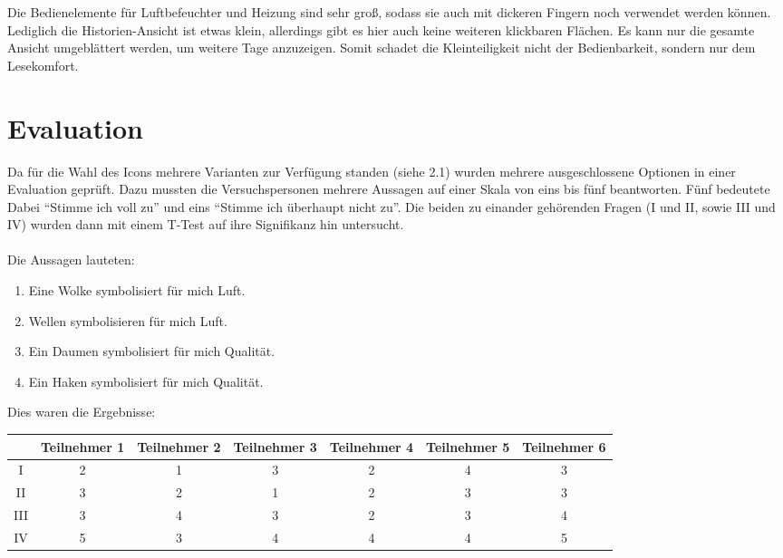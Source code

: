 \documentclass[a4paper,10pt]{article}
\begin{document}
Die Bedienelemente für Luftbefeuchter und Heizung sind sehr groß, sodass sie auch mit dickeren Fingern noch verwendet werden können. Lediglich die Historien-Ansicht ist etwas klein, allerdings gibt es hier auch keine weiteren klickbaren Flächen. Es kann nur die gesamte Ansicht umgeblättert werden, um weitere Tage anzuzeigen. Somit schadet die Kleinteiligkeit nicht der Bedienbarkeit, sondern nur dem Lesekomfort.

\newpage



\section{Evaluation}

Da für die Wahl des Icons mehrere Varianten zur Verfügung standen (siehe 2.1) wurden mehrere ausgeschlossene Optionen in einer Evaluation geprüft. Dazu mussten die Versuchspersonen mehrere Aussagen auf einer Skala von eins bis fünf beantworten. Fünf bedeutete Dabei ``Stimme ich voll zu'' und eins ``Stimme ich überhaupt nicht zu''. Die beiden zu einander gehörenden Fragen (I und II, sowie III und IV) wurden dann mit einem T-Test auf ihre Signifikanz hin untersucht.\\ \\

Die Aussagen lauteten:

\begin{enumerate}[I]

\item
Eine Wolke symbolisiert für mich Luft.

\item
Wellen symbolisieren für mich Luft.

\item
Ein Daumen symbolisiert für mich Qualität.

\item
Ein Haken symbolisiert für mich Qualität. \\

\end{enumerate}

Dies waren die Ergebnisse:\\

\begin{tabular}{c|c|c|c|c|c|c}
& Teilnehmer 1 & Teilnehmer 2 & Teilnehmer 3 & Teilnehmer 4 & Teilnehmer 5 & Teilnehmer 6 \\ 
\hline I   & 2 & 1 & 3 & 2 & 4 & 3 \\ 
\hline II  & 3 & 2 & 1 & 2 & 3 & 3 \\ 
\hline III & 3 & 4 & 3 & 2 & 3 & 4 \\ 
\hline IV  & 5 & 3 & 4 & 4 & 4 & 5 \\
\end{tabular}\\ \\ \\
\end{document}
